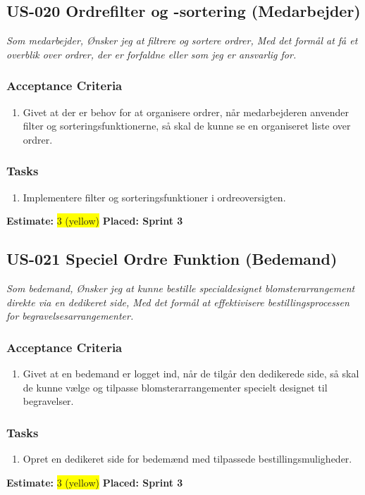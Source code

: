 \subsection{US-020 Ordrefilter og -sortering (Medarbejder)}
\label{sec:US-020}
\textit{Som medarbejder, Ønsker jeg at filtrere og sortere ordrer, Med det formål at få et overblik over ordrer, der er forfaldne eller som jeg er ansvarlig for.}
\subsubsection*{\textbf{Acceptance Criteria}}
\begin{enumerate}
  \item Givet at der er behov for at organisere ordrer, når medarbejderen anvender filter og sorteringsfunktionerne, så skal de kunne se en organiseret liste over ordrer.
\end{enumerate}
\subsubsection*{\textbf{Tasks}}
\begin{enumerate}
  \item Implementere filter og sorteringsfunktioner i ordreoversigten.
\end{enumerate}
\textbf{Estimate:} \colorbox{yellow}{3 (yellow)}
\textbf{Placed: Sprint 3}
\par\noindent\dotfill

\subsection{US-021 Speciel Ordre Funktion (Bedemand)}
\label{sec:US-021}
\textit{Som bedemand, Ønsker jeg at kunne bestille specialdesignet blomsterarrangement direkte via en dedikeret side, Med det formål at effektivisere bestillingsprocessen for begravelsesarrangementer.}
\subsubsection*{\textbf{Acceptance Criteria}}
\begin{enumerate}
  \item Givet at en bedemand er logget ind, når de tilgår den dedikerede side, så skal de kunne vælge og tilpasse blomsterarrangementer specielt designet til begravelser.
\end{enumerate}
\subsubsection*{\textbf{Tasks}}
\begin{enumerate}
  \item Opret en dedikeret side for bedemænd med tilpassede bestillingsmuligheder.
\end{enumerate}
\textbf{Estimate:} \colorbox{yellow}{3 (yellow)}
\textbf{Placed: Sprint 3}
\par\noindent\dotfill

